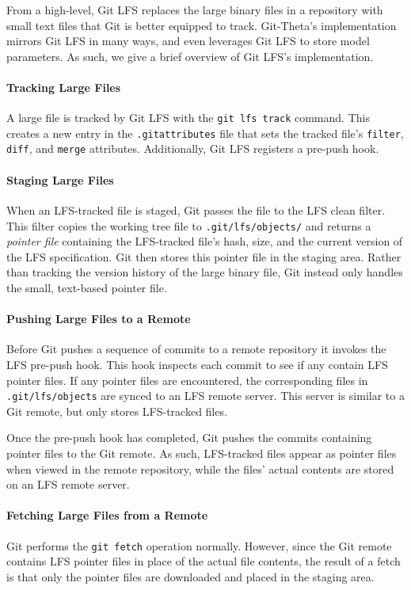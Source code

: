 \documentclass[nohyperref]{article}
\def\code#1{\texttt{#1}}
\theoremstyle{plain}
\theoremstyle{definition}
\theoremstyle{remark}
\begin{document}
From a high-level, Git LFS replaces the large binary files in a repository with small text files that Git is better equipped to track. Git-Theta's implementation mirrors Git LFS in many ways, and even leverages Git LFS to store model parameters. As such, we give a brief overview of Git LFS's implementation.

\paragraph{Tracking Large Files}
A large file is tracked by Git LFS with the \code{git lfs track} command. This creates a new entry in the \code{.gitattributes} file that sets the tracked file's \code{filter}, \code{diff}, and \code{merge} attributes. Additionally, Git LFS registers a pre-push hook.

\paragraph{Staging Large Files}
When an LFS-tracked file is staged, Git passes the file to the LFS clean filter. This filter copies the working tree file to \code{.git/lfs/objects/} and returns a \emph{pointer file} containing the LFS-tracked file's hash, size, and the current version of the LFS specification. Git then stores this pointer file in the staging area. Rather than tracking the version history of the large binary file, Git instead only handles the small, text-based pointer file.

\paragraph{Pushing Large Files to a Remote}
Before Git pushes a sequence of commits to a remote repository it invokes the LFS pre-push hook. This hook inspects each commit to see if any contain LFS pointer files. If any pointer files are encountered, the corresponding files in \code{.git/lfs/objects} are synced to an LFS remote server. This server is similar to a Git remote, but only stores LFS-tracked files. 

Once the pre-push hook has completed, Git pushes the commits containing pointer files to the Git remote. As such, LFS-tracked files appear as pointer files when viewed in the remote repository, while the files' actual contents are stored on an LFS remote server.

\paragraph{Fetching Large Files from a Remote}
Git performs the \code{git fetch} operation normally. However, since the Git remote contains LFS pointer files in place of the actual file contents, the result of a fetch is that only the pointer files are downloaded and placed in the staging area.
\end{document}
